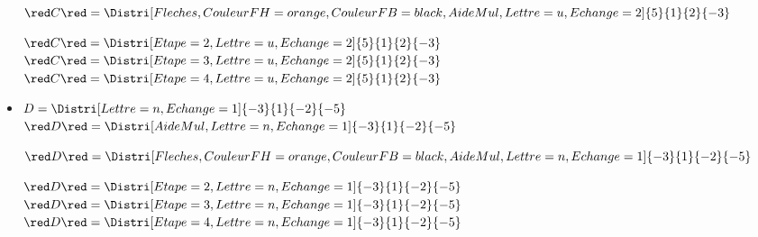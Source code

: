 \begin{corrige}
\begin{itemize}
        \bigskip
        ${\red C}{\red =\Distri[Fleches,CouleurFH=orange,CouleurFB=black,AideMul,Lettre=u,Echange=2]{5}{1}{2}{-3}}$
        
        \bigskip
        ${\red C}{\red =\Distri[Etape=2,Lettre=u,Echange=2]{5}{1}{2}{-3}}$\\
        ${\red C}{\red =\Distri[Etape=3,Lettre=u,Echange=2]{5}{1}{2}{-3}}$\\
        ${\red C}{\red =\Distri[Etape=4,Lettre=u,Echange=2]{5}{1}{2}{-3}}$
        
        \bigskip
        \item $D=\Distri[Lettre=n,Echange=1]{-3}{1}{-2}{-5}$\\
        ${\red D}{\red = \Distri[AideMul,Lettre=n,Echange=1]{-3}{1}{-2}{-5}}$
        
        \bigskip        
        ${\red D}{\red =\Distri[Fleches,CouleurFH=orange,CouleurFB=black,AideMul,Lettre=n,Echange=1]{-3}{1}{-2}{-5}}$
        
        \bigskip
        ${\red D}{\red =\Distri[Etape=2,Lettre=n,Echange=1]{-3}{1}{-2}{-5}}$\\
        ${\red D}{\red =\Distri[Etape=3,Lettre=n,Echange=1]{-3}{1}{-2}{-5}}$\\
        ${\red D}{\red =\Distri[Etape=4,Lettre=n,Echange=1]{-3}{1}{-2}{-5}}$\\
    \end{itemize}
\end{corrige}

